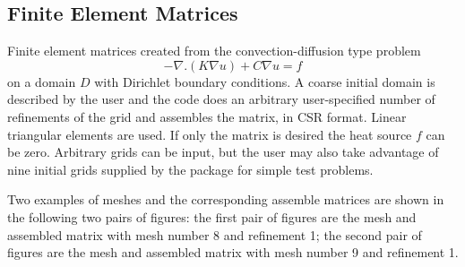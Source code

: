 \subsection{Finite Element Matrices}

Finite element matrices created from the convection-diffusion type problem 
\begin{equation} - \nabla . ({ K \nabla u }) + {C \nabla u} = f \label{kikuchi} 
\end{equation}
on a domain $D$ with Dirichlet boundary conditions.  A coarse initial domain
is described by the user and the code does an arbitrary user-specified number
of refinements of the grid and assembles the matrix, in CSR format.
Linear triangular elements are used.  If only the matrix is desired the heat
source $f$ can be zero. Arbitrary grids can be input, but the user may 
also take advantage of nine initial grids
supplied by the package for simple test problems. 

Two examples of meshes and the corresponding assemble matrices are shown
in the following two pairs of figures: the first pair of figures are the mesh 
and assembled matrix with mesh number 8 and refinement 1; the second pair of
figures are the mesh and assembled matrix with mesh number 9 and refinement 1.

\begin{figure}[h]
\end{figure}

\begin{figure}[h]
\end{figure}

\newpage

\begin{figure}[h]
\end{figure}

\begin{figure}[h]
\end{figure}


